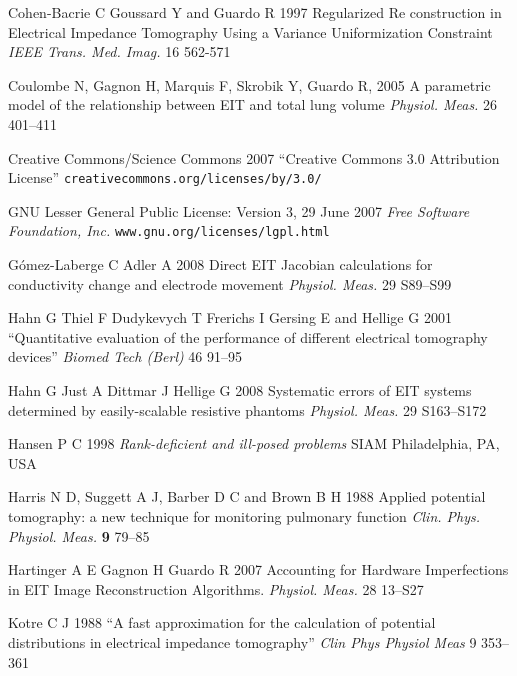 \documentclass[12pt]{iopart}
\begin{document}
\item[]
Cohen-Bacrie C  Goussard Y and Guardo R
1997
Regularized Re construction in Electrical
Impedance Tomography Using a Variance
Uniformization Constraint 
{\em IEEE Trans. Med. Imag.} 16 562-571

\item[]
Coulombe N, Gagnon H, Marquis F, Skrobik Y, Guardo R, 2005
A parametric model of the relationship between EIT and total lung volume
{\em Physiol. Meas.}
26 401--411


\item[]
Creative Commons/Science Commons 2007
``Creative Commons 3.0 Attribution License''
\verb+creativecommons.org/licenses/by/3.0/+

\item[]
GNU Lesser General Public License: Version 3, 29 June 2007
{\em Free Software Foundation, Inc.}
\verb+www.gnu.org/licenses/lgpl.html+

G\'omez-Laberge C Adler A 2008
Direct EIT Jacobian calculations for conductivity change and electrode movement
{\em Physiol. Meas.}
29 S89--S99


\item[]
Hahn G Thiel F Dudykevych T Frerichs I Gersing E
and Hellige G 2001
``Quantitative evaluation of the performance of
different electrical tomography devices''
{\em  Biomed Tech (Berl)}
46 91--95

\item[]
Hahn G Just A Dittmar J  Hellige G 2008
Systematic errors of EIT systems determined by easily-scalable
 resistive phantoms
{\em Physiol. Meas.}
 29 S163--S172


\item[]
Hansen P C 1998 {\em Rank-deficient and ill-posed problems}
SIAM Philadelphia, PA, USA

\item[]
Harris N D, Suggett A J, Barber D C and Brown B H 1988 Applied
potential tomography: a new technique for monitoring pulmonary
function {\em Clin. Phys. Physiol. Meas.} {\bf 9} 79--85

\item[]
Hartinger A E Gagnon H Guardo R 2007
Accounting for Hardware Imperfections in EIT Image
Reconstruction Algorithms.
{\em Physiol. Meas.}
28 13--S27
 
\item[]
Kotre C J 1988
``A fast approximation for the calculation of potential distributions in electrical impedance tomography''
{\em Clin Phys Physiol Meas}
9 353--361
\end{document}
